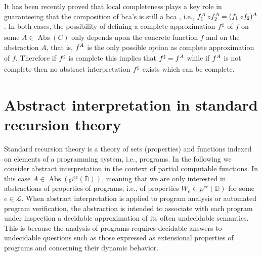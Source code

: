 \documentclass[runningheads]{llncs}
\def\ok#1{\mbox{\raisebox{0ex}[1ex][1ex]{$#1$}}}
\def\wpre{\wp^{\text{ce}}}
\newcommand{\ccL}{\mathscr{L}}
\newcommand{\Domain}{\mathbb{D}}
\DeclareMathOperator{\Abs}{Abs}
\def\ok#1{\mbox{\raisebox{0ex}[1ex][1ex]{$#1$}}}
\def\gfp{{\sf gfp\/}}
\def\comp{\hbox{\;\footnotesize$\circ$\normalsize}}
\def\cAA{\ensuremath{A}}
\begin{document}
It has been recently proved that local completeness plays a key role in guaranteeing that the composition of bca's is still a bca \cite{GiacobazziR25}, i.e., 
$f_1^{\cAA}\comp f_2^{\cAA} = (f_1\comp f_2)^{\cAA}$.
In both cases, the possibility of
defining a complete approximation $\ok{f^\sharp}$ of $f$ on some $A\in \Abs(C)$ 
only depends upon the concrete function $f$ and on the abstraction $A$, that is, 
$\ok{f^A}$ is the only possible option as complete approximation of $f$. Therefore 
if $\ok{f^\sharp}$ is complete this implies that $\ok{f^\sharp=f^\cAA}$ while 
if $\ok{f^\cAA}$ is not complete then no abstract interpretation $\ok{f^\sharp}$ exists which can be complete.
%
%

\section{Abstract interpretation in standard recursion theory}\label{AbsIntRec}

Standard recursion theory is a theory of sets (properties) and functions indexed on elements of a programming system, i.e., programs. In the following we consider abstract interpretation in the context of partial computable functions. In this case $\cAA\in\Abs(\wpre(\Domain))$, meaning that we are only interested in abstractions of properties of programs, i.e., of properties $W_e\in \wpre(\Domain)$ for some $e\in\ccL$. 
When abstract interpretation is applied to program analysis or automated program verification, 
the abstraction is intended to associate with each program under inspection a decidable approximation of its often undecidable semantics. 
This is because the analysis of programs requires decidable answers to undecidable questions such as
those expressed as extensional properties of programs and concerning their dynamic behavior. 
\end{document}
